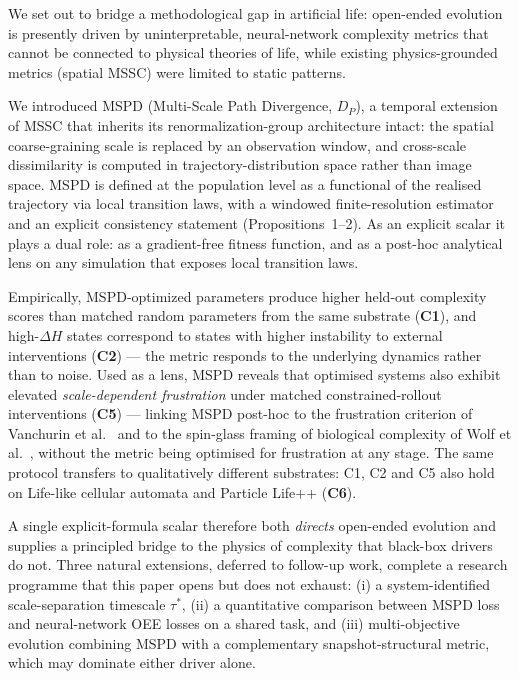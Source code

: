 \documentclass[
  11pt,
]{article}
\begin{document}
We set out to bridge a methodological gap in artificial life:
open-ended evolution is presently driven by uninterpretable,
neural-network complexity metrics that cannot be connected to physical
theories of life, while existing physics-grounded metrics
(spatial MSSC) were limited to static patterns.

We introduced MSPD (Multi-Scale Path Divergence, $D_P$), a
temporal extension of MSSC that inherits its
renormalization-group architecture intact: the spatial
coarse-graining scale is replaced by an observation window,
and cross-scale dissimilarity is computed in
trajectory-distribution space rather than image space. MSPD is
defined at the population level as a functional of the realised
trajectory via local transition laws, with a windowed
finite-resolution estimator and an explicit consistency
statement (Propositions~1--2). As an explicit scalar it plays a
dual role: as a gradient-free fitness function, and as a
post-hoc analytical lens on any simulation that exposes local
transition laws.

Empirically, MSPD-optimized parameters produce higher held-out
complexity scores than matched random parameters from the same
substrate (\textbf{C1}), and high-$\Delta H$ states correspond
to states with higher instability to external interventions
(\textbf{C2}) --- the metric responds to the underlying
dynamics rather than to noise. Used as a lens, MSPD reveals
that optimised systems also exhibit elevated
\emph{scale-dependent frustration} under matched
constrained-rollout interventions (\textbf{C5}) --- linking
MSPD post-hoc to the frustration criterion of Vanchurin et
al.~\cite{vanchurin2022toward} and to the spin-glass framing of
biological complexity of Wolf et al.~\cite{wolf2018physical},
without the metric being optimised for frustration at any
stage. The same protocol transfers to qualitatively different
substrates: C1, C2 and C5 also hold on Life-like cellular
automata and Particle Life++ (\textbf{C6}).

A single explicit-formula scalar therefore both \emph{directs}
open-ended evolution and supplies a principled bridge to the
physics of complexity that black-box drivers do not. Three
natural extensions, deferred to follow-up work, complete a
research programme that this paper opens but does not exhaust:
(i) a system-identified scale-separation timescale $\tau^*$,
(ii) a quantitative comparison between MSPD loss and
neural-network OEE losses on a shared task, and
(iii) multi-objective evolution combining MSPD with a
complementary snapshot-structural metric, which may dominate
either driver alone.
\end{document}

